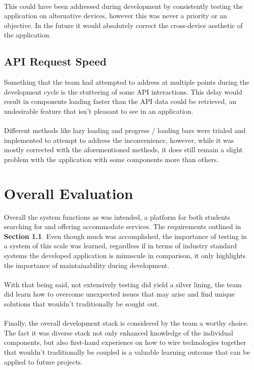 \paragraph{}
This could have been addressed during development by consistently testing the application on alternative devices, however this was never a priority or an objective. In the future it would absolutely correct the cross-device aesthetic of the application.

\subsection{API Request Speed}
Something that the team had attempted to address at multiple points during the development cycle is the stuttering of some API interactions. This delay would result in components loading faster than the API data could be retrieved, an undesirable feature that isn't pleasant to see in an application. 

\paragraph{}
Different methods like lazy loading and progress / loading bars were trialed and implemented to attempt to address the inconvenience, however, while it was mostly corrected with the aforementioned methods, it does still remain a slight problem with the application with some components more than others.

\section{Overall Evaluation}
Overall the system functions as was intended, a platform for both students searching for and offering accommodate services. The requirements outlined in \textbf{Section 1.1}. Even though much was accomplished, the importance of testing in a system of this scale was learned, regardless if in terms of industry standard systems the developed application is minuscule in comparison, it only highlights the importance of maintainability during development.

\paragraph{}
With that being said, not extensively testing did yield a silver lining, the team did learn how to overcome unexpected issues that may arise and find unique solutions that wouldn't traditionally be sought out.

\paragraph{}
Finally, the overall development stack is considered by the team a worthy choice. The fact it was diverse stack not only enhanced knowledge of the individual components, but also first-hand experience on how to wire technologies together that wouldn't traditionally be coupled is a valuable learning outcome that can be applied to future projects. 

